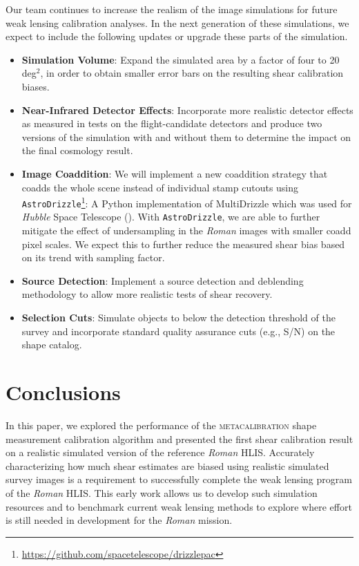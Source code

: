 \documentclass[fleqn,usenatbib]{mnras}
\begin{document}
Our team continues to increase the realism of the image simulations for future weak lensing calibration analyses. In the next generation of these simulations, we expect to include the following updates or upgrade these parts of the simulation. 
\begin{itemize}
    \setlength\itemsep{1em}
    \item \textbf{Simulation Volume}: Expand the simulated area by a factor of four to 20 deg$^{2}$, in order to obtain smaller error bars on the resulting shear calibration biases. 
    
    \item \textbf{Near-Infrared Detector Effects}: Incorporate more realistic detector effects as measured in tests on the flight-candidate detectors and produce two versions of the simulation with and without them to determine the impact on the final cosmology result.
    
    \item \textbf{Image Coaddition}: We will implement a new coaddition strategy that coadds the whole scene instead of individual stamp cutouts using  \texttt{AstroDrizzle}\footnote{\url{https://github.com/spacetelescope/drizzlepac}}: A Python implementation of MultiDrizzle which was used for \emph{Hubble} Space Telescope (\citealt{2003hstc.conf..325B}). With \texttt{AstroDrizzle}, we are able to further mitigate the effect of undersampling in the \emph{Roman} images with smaller coadd pixel scales. We expect this to further reduce the measured shear bias based on its trend with sampling factor.
    
    \item \textbf{Source Detection}: Implement a source detection and deblending methodology to allow more realistic tests of shear recovery.
    
    \item \textbf{Selection Cuts}: Simulate objects to below the detection threshold of the survey and incorporate standard quality assurance cuts (e.g., S/N) on the shape catalog. 
\end{itemize}

\section{Conclusions}\label{sec:conclusion}

In this paper, we explored the performance of the \textsc{metacalibration} shape measurement calibration algorithm and presented the first shear calibration result on a realistic simulated version of the reference \emph{Roman} HLIS. Accurately characterizing how much shear estimates are biased using realistic simulated survey images is a requirement to successfully complete the weak lensing program of the \emph{Roman} HLIS. This early work allows us to develop such simulation resources and to benchmark current weak lensing methods to explore where effort is still needed in development for the \emph{Roman} mission. 
\end{document}
